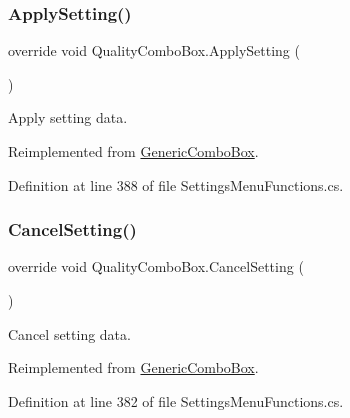 \subsubsection{\texorpdfstring{Apply\+Setting()}{ApplySetting()}}
{\footnotesize\ttfamily override void Quality\+Combo\+Box.\+Apply\+Setting (\begin{DoxyParamCaption}{ }\end{DoxyParamCaption})\hspace{0.3cm}{\ttfamily [virtual]}}



Apply setting data. 



Reimplemented from \hyperlink{class_generic_combo_box_a5aced71f035bd463a4ebaaffe19ec547}{Generic\+Combo\+Box}.



Definition at line 388 of file Settings\+Menu\+Functions.\+cs.

\mbox{\label{class_quality_combo_box_a04e70d34dd0b977690f593cfd4ecbe6b}} 
\subsubsection{\texorpdfstring{Cancel\+Setting()}{CancelSetting()}}
{\footnotesize\ttfamily override void Quality\+Combo\+Box.\+Cancel\+Setting (\begin{DoxyParamCaption}{ }\end{DoxyParamCaption})\hspace{0.3cm}{\ttfamily [virtual]}}



Cancel setting data. 



Reimplemented from \hyperlink{class_generic_combo_box_a0949a84cf1e33d13346cb90597e005ce}{Generic\+Combo\+Box}.



Definition at line 382 of file Settings\+Menu\+Functions.\+cs.

\mbox{\label{class_quality_combo_box_a8f6e77ad23e7e937c023d4ad4f9aeaa4}} 

